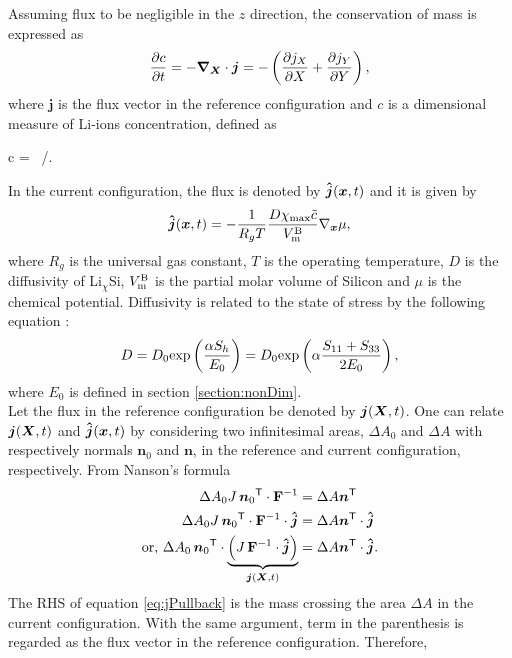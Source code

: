 Assuming flux to be negligible in the $z$ direction, the conservation of mass is expressed as
\begin{gather}
    \frac{\partial c}{\partial t} = - \bm{\nabla}_{\bm{X}} \cdot \bm{j} = -\left(\frac{\partial j_X}{\partial X} + \frac{\partial j_Y}{\partial Y}\right),
\end{gather}
where $\bm{j}$ is the flux vector in the reference configuration and $c$ is a dimensional measure of Li-ions concentration, defined as 
\begin{nonumbereq}
 c = \tc \, \xmax/\vmb.
\end{nonumbereq}
In the current configuration, the flux is denoted by $\bm{\hat{j}}({\bm{x}}, t)$ and it is given by \citep{2008JMPSHong}
\begin{gather}
    \bm{\hat{j}}({\bm{x}}, t) = -\frac{1}{R_g T} \frac{D \chi_{{\rm{max}}} \tilde{c}}{V_{\rm{m}}^{\rm{B}}} \nabla_{{\bm{x}}} \mu,
\end{gather} 
where $R_g$ is the universal gas constant, $T$ is the operating temperature, $D$ is the diffusivity of Li$_{\chi}$Si, $V_{\rm{m}}^{\rm{B}}$ is the partial molar volume of Silicon and $\mu$ is the chemical potential. Diffusivity is related to the state of stress by the following equation \citep{2011JPSHaftbaradaran} :
\begin{gather} 
 D = D_0 {\rm{exp}}\left(\frac{\alpha S_h}{E_0}\right) = D_0 {\rm{exp}}\left(\alpha \frac{{S}_{11}+{S}_{33}}{2 E_0}\right), 
\end{gather}
where $E_0$ is defined in section \ref{section:nonDim}. \\
Let the flux in the reference configuration be denoted by $\bm{j}({\bm{X}}, t)$. One can relate $\bm{j}({\bm{X}}, t)$ and $\bm{\hat{j}}({\bm{x}}, t)$ by considering two infinitesimal areas, $\Delta A_0$ and $\Delta A$ with respectively normals $\bm{n}_0$ and $\bm{n}$, in the reference and current configuration, respectively. From Nanson's formula 
\begin{align}
     \Delta A_0 J \, {\bm{n}_0}^{{\sf {T}}} \cdot \mathbf{F}^{-1} &= \Delta A {\bm{n}}^{{\sf {T}}} \nonumber \\
    \Delta A_0 J \, {\bm{n}_0}^{{\sf {T}}} \cdot \mathbf{F}^{-1} \cdot \bm{\hat{j}} &= \Delta A {\bm{n}}^{{\sf {T}}} \cdot \bm{\hat{j}} \nonumber \\
    \text{or, }\Delta A_0  \, {\bm{n}_0}^{{\sf {T}}} \cdot \underbrace{\left( J \, \mathbf{F}^{-1} \cdot \bm{\hat{j}} \right)}_{\bm{j}({\bm{X}}, t)} &= \Delta A {\bm{n}}^{{\sf {T}}} \cdot \bm{\hat{j}}. \label{eq:jPullback}
\end{align} The RHS of equation \ref{eq:jPullback} is the mass crossing the area $\Delta A$ in the current configuration. With the same argument, term in the parenthesis is regarded as the flux vector in the reference configuration. Therefore, 
